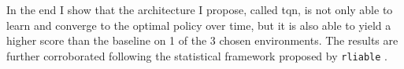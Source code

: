 In the end I show that the architecture I propose, called \acrfull{tqn}, is not only able to learn and converge to the optimal policy over time, but it is also able to yield a higher score than the baseline on 1 of the 3 chosen environments. The results are further corroborated following the statistical framework proposed by \texttt{rliable} \cite{rliable}.
